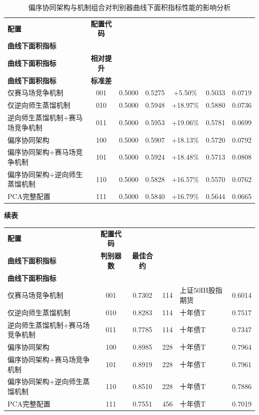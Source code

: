 \begin{table}[H]
\centering
\caption{偏序协同架构与机制组合对判别器曲线下面积指标性能的影响分析}
\label{tab:aucPerformance}
\footnotesize
\setlength{\tabcolsep}{3pt}
\renewcommand{\arraystretch}{1.18}
\begin{tabular}{p{3.0cm}cccccc}
\toprule
\textbf{配置} & \textbf{配置代码} & \makecell{\textbf{随机基准}\\\textbf{曲线下面积指标}} & \makecell{\textbf{配置平均}\\\textbf{曲线下面积指标}} & \textbf{相对提升} & \makecell{\textbf{中位数}\\\textbf{曲线下面积指标}} & \textbf{标准差} \\
\midrule
仅赛马场竞争机制 & 001 & 0.5000 & 0.5275 & +5.50\% & 0.5033 & 0.0719 \\
仅逆向师生蒸馏机制 & 010 & 0.5000 & 0.5948 & +18.97\% & 0.5880 & 0.0736 \\
逆向师生蒸馏机制+赛马场竞争机制 & 011 & 0.5000 & 0.5953 & +19.06\% & 0.5781 & 0.0699 \\
偏序协同架构 & 100 & 0.5000 & 0.5907 & +18.13\% & 0.5720 & 0.0792 \\
偏序协同架构+赛马场竞争机制 & 101 & 0.5000 & 0.5924 & +18.48\% & 0.5713 & 0.0808 \\
偏序协同架构+逆向师生蒸馏机制 & 110 & 0.5000 & 0.5828 & +16.57\% & 0.5570 & 0.0762 \\
PCA完整配置 & 111 & 0.5000 & 0.5840 & +16.79\% & 0.5644 & 0.0665 \\
\bottomrule
\end{tabular}
\end{table}
\begin{table}[H]
\centering
{\small\textbf{续表}}\\[0.5em]
\footnotesize
\setlength{\tabcolsep}{4pt}
\renewcommand{\arraystretch}{1.18}
\begin{tabular}{p{3.2cm}ccclc}
\toprule
\textbf{配置} & \textbf{配置代码} & \makecell{\textbf{最高}\\\textbf{曲线下面积指标}} & \textbf{判别器数} & \textbf{最佳合约} & \makecell{\textbf{最佳合约}\\\textbf{曲线下面积指标}} \\
\midrule
仅赛马场竞争机制 & 001 & 0.7302 & 114 & 上证50IH股指期货 & 0.6014 \\
仅逆向师生蒸馏机制 & 010 & 0.8283 & 114 & 十年债T & 0.7517 \\
逆向师生蒸馏机制+赛马场竞争机制 & 011 & 0.7785 & 114 & 十年债T & 0.7347 \\
偏序协同架构 & 100 & 0.8985 & 228 & 十年债T & 0.7964 \\
偏序协同架构+赛马场竞争机制 & 101 & 0.8919 & 228 & 十年债T & 0.7961 \\
偏序协同架构+逆向师生蒸馏机制 & 110 & 0.8510 & 228 & 十年债T & 0.7886 \\
PCA完整配置 & 111 & 0.7551 & 456 & 十年债T & 0.7019 \\
\bottomrule
\end{tabular}
\end{table}

